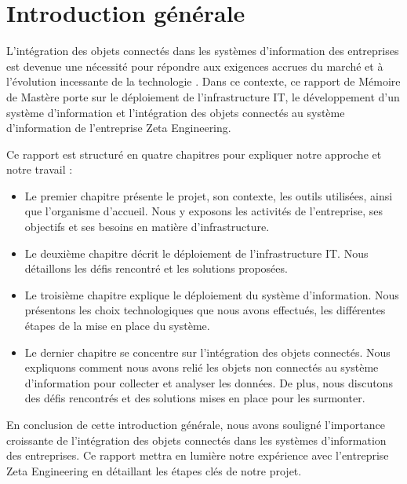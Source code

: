 \chapter*{Introduction générale}

\setlength{\parskip}{1em}
\setlength{\parindent}{1cm}

\large {
L'intégration des objets connectés dans les systèmes d’information des entreprises est devenue une nécessité pour répondre aux exigences accrues du marché et à l’évolution incessante de la technologie \cite{antoine2019vers}. Dans ce contexte, ce rapport de Mémoire de Mastère porte sur le déploiement de l'infrastructure IT, le développement d'un système d'information et l'intégration des objets connectés au système d’information de l’entreprise Zeta Engineering.

Ce rapport est structuré en quatre chapitres pour expliquer notre approche et notre travail :

\begin{itemize}
\item Le premier chapitre présente le projet, son contexte, les outils utilisées, ainsi que l'organisme d'accueil. Nous y exposons les activités de l'entreprise, ses objectifs et ses besoins en matière d'infrastructure.
\item Le deuxième chapitre décrit le déploiement de l'infrastructure IT. Nous détaillons les défis rencontré et les solutions proposées.
\item Le troisième chapitre explique le déploiement du système d'information. Nous présentons les choix technologiques que nous avons effectués, les différentes étapes de la mise en place du système.
\item Le dernier chapitre se concentre sur l'intégration des objets connectés. Nous expliquons comment nous avons relié les objets non connectés au système d'information pour collecter et analyser les données. De plus, nous discutons des défis rencontrés et des solutions mises en place pour les surmonter.
\end{itemize}

En conclusion de cette introduction générale, nous avons souligné l'importance croissante de l'intégration des objets connectés dans les systèmes d’information des entreprises. Ce rapport mettra en lumière notre expérience avec l'entreprise Zeta Engineering en détaillant les étapes clés de notre projet.
}
